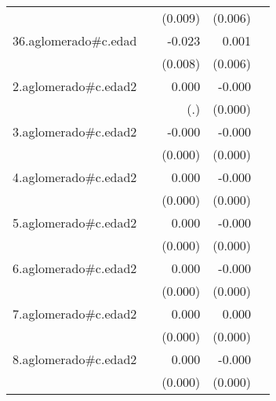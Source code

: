{\begin{longtable}{l*{4}{D{.}{.}{-1}}}
            &                     &     (0.009)         &     (0.006)         &                     \\
\addlinespace
36.aglomerado#c.edad&                     &      -0.023\sym{**} &       0.001         &                     \\
            &                     &     (0.008)         &     (0.006)         &                     \\
\addlinespace
2.aglomerado#c.edad2&                     &       0.000         &      -0.000\sym{**} &                     \\
            &                     &         (.)         &     (0.000)         &                     \\
\addlinespace
3.aglomerado#c.edad2&                     &      -0.000         &      -0.000\sym{**} &                     \\
            &                     &     (0.000)         &     (0.000)         &                     \\
\addlinespace
4.aglomerado#c.edad2&                     &       0.000         &      -0.000         &                     \\
            &                     &     (0.000)         &     (0.000)         &                     \\
\addlinespace
5.aglomerado#c.edad2&                     &       0.000         &      -0.000         &                     \\
            &                     &     (0.000)         &     (0.000)         &                     \\
\addlinespace
6.aglomerado#c.edad2&                     &       0.000         &      -0.000\sym{*}  &                     \\
            &                     &     (0.000)         &     (0.000)         &                     \\
\addlinespace
7.aglomerado#c.edad2&                     &       0.000         &       0.000         &                     \\
            &                     &     (0.000)         &     (0.000)         &                     \\
\addlinespace
8.aglomerado#c.edad2&                     &       0.000         &      -0.000         &                     \\
            &                     &     (0.000)         &     (0.000)         &                     \\

\end{longtable}}
